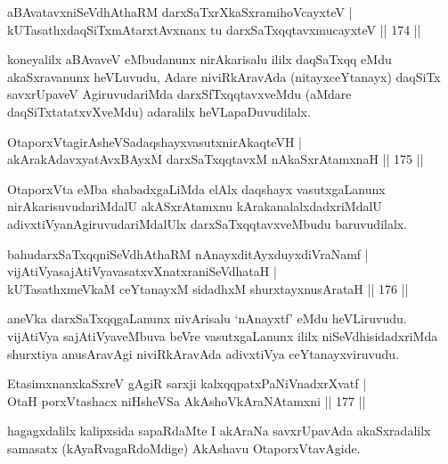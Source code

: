 \begin{shl}
aBAvatavxniSeVdhAthaRM darxSaTxrXkaSxramihoVcayxteV |\\
kUTasathxdaqSiTxmAtarxtAvxnanx tu darxSaTxqqtavxmucayxteV \hfill || 174 ||
\end{shl}

\begin{artha}
koneyalilx aBAvaveV eMbudanunx nirAkarisalu ililx daqSaTxqq eMdu akaSxravanunx heVLuvudu, Adare niviRkAravAda (nitayxceYtanayx) daqSiTx savxrUpaveV AgiruvudariMda darxSfTxqqtavxveMdu (aMdare daqSiTxtatatxvXveMdu) adaralilx heVLapaDuvudilalx.
\end{artha}

\begin{shl}
OtaporxVtagirA\s sheVSadaqshayxvasutxnirAkaqteVH |\\
akArakAdavxyatAvxBAyxM darxSaTxqqtavxM nAkaSxrAtamxnaH \hfill || 175 ||
\end{shl}

\begin{artha}
OtaporxVta eMba shabadxgaLiMda elAlx daqshayx vasutxgaLanunx nirAkarisuvudariMdalU akASxrAtamxnu kArakanalalxdadxriMdalU adivxtiVyanAgiruvudariMdalUlx darxSaTxqqtavxveMbudu baruvudilalx.
\end{artha}


\begin{shl}
bahudarxSaTxqqniSeVdhAthaRM nAnayxditAyxduyxdiVraNamf |\\
vijAtiVyasajAtiVyavasatxvXnatxraniSeVdhataH |\\
kUTasathxmeVkaM ceYtanayxM sidadhxM shurxtayxnusArataH \hfill || 176 ||
\end{shl}

\begin{artha}
aneVka darxSaTxqqgaLanunx nivArisalu `nAnayxtf' eMdu heVLiruvudu. vijAtiVya sajAtiVyaveMbuva beVre vasutxgaLanunx ililx niSeVdhisidadxriMda shurxtiya anusAravAgi niviRkAravAda adivxtiVya ceYtanayxviruvudu.
\end{artha}

\begin{shl}
EtasimxnanxkaSxreV gAgiR sarxji kalxqqpatxPaNiVnadxrXvatf |\\
OtaH porxVtashacx niHsheVSa AkAshoV\s kAraNAtamxni \hfill || 177 ||
\end{shl}

\begin{artha}
hagagxdalilx kalipxsida sapaRdaMte I akAraNa savxrUpavAda akaSxradalilx samasatx (kAyaRvagaRdoMdige) AkAshavu OtaporxVtavAgide.
\end{artha}


